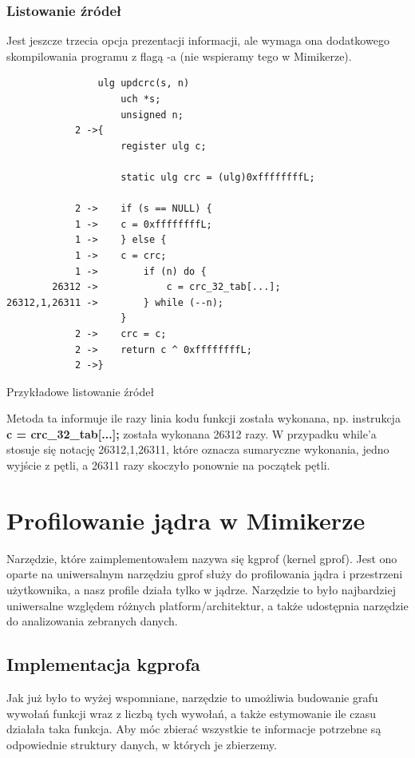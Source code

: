 \documentclass[shortabstract]{iithesis}
\theoremstyle{definition} \newtheorem*{definition}{Definicja}
\theoremstyle{definition} \newtheorem*{example}{Przykład}
\theoremstyle{definition} \newtheorem*{remark}{Uwaga}
\newenvironment{longlisting}{\captionsetup{type=listing}}{}
\begin{document}
\subsection{Listowanie źródeł}

Jest jeszcze trzecia opcja prezentacji informacji, ale wymaga ona dodatkowego skompilowania programu z flagą -a (nie wspieramy tego w Mimikerze).

\begin{longlisting}
  \begin{verbatim}
                ulg updcrc(s, n)
                    uch *s;
                    unsigned n;
            2 ->{
                    register ulg c;
                
                    static ulg crc = (ulg)0xffffffffL;
                
            2 ->    if (s == NULL) {
            1 ->	c = 0xffffffffL;
            1 ->    } else {
            1 ->	c = crc;
            1 ->        if (n) do {
        26312 ->            c = crc_32_tab[...];
26312,1,26311 ->        } while (--n);
                    }
            2 ->    crc = c;
            2 ->    return c ^ 0xffffffffL;
            2 ->}
  \end{verbatim}
  \caption{Przykładowe listowanie źródeł}
  \label{lst:srclist}
\end{longlisting}

Metoda ta informuje ile razy linia kodu funkcji została wykonana, np. instrukcja \textbf{c = crc\_32\_tab[...];} została wykonana 26312 razy. W przypadku while'a stosuje się notację 26312,1,26311, które oznacza sumaryczne wykonania, jedno wyjście z pętli, a 26311 razy skoczyło ponownie na początek pętli.

\chapter{Profilowanie jądra w Mimikerze}

Narzędzie, które zaimplementowałem nazywa się kgprof (kernel gprof). Jest ono oparte na uniwersalnym narzędziu gprof \cite{bib:gprof} służy do profilowania jądra i przestrzeni użytkownika, a nasz profile działa tylko w jądrze. Narzędzie to było najbardziej uniwersalne względem różnych platform/architektur, a także udostępnia narzędzie do analizowania zebranych danych. 


\section{Implementacja kgprofa}
Jak już było to wyżej wspomniane, narzędzie to umożliwia budowanie grafu wywołań funkcji wraz z liczbą tych wywołań, a także estymowanie ile czasu działała taka funkcja. Aby móc zbierać wszystkie te informacje potrzebne są odpowiednie struktury danych, w których je zbierzemy.
\end{document}
